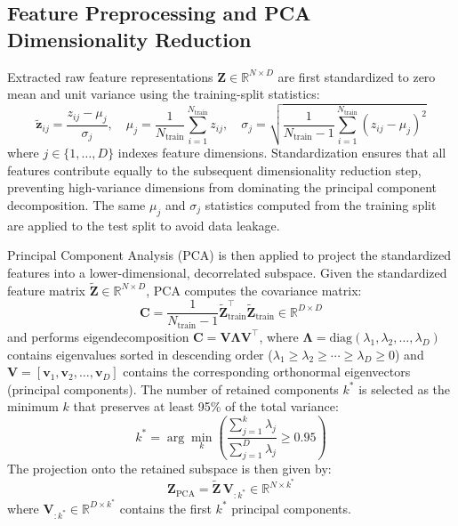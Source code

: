 \subsection{Feature Preprocessing and PCA Dimensionality Reduction}

Extracted raw feature representations $\mathbf{Z} \in \mathbb{R}^{N \times D}$ are first standardized to zero mean and unit variance using the training-split statistics:
\begin{equation}
\tilde{\mathbf{z}}_{ij} = \frac{z_{ij} - \mu_j}{\sigma_j}, \quad \mu_j = \frac{1}{N_{\text{train}}} \sum_{i=1}^{N_{\text{train}}} z_{ij}, \quad \sigma_j = \sqrt{\frac{1}{N_{\text{train}}-1} \sum_{i=1}^{N_{\text{train}}} (z_{ij} - \mu_j)^2}
\label{eq:standardization}
\end{equation}
where $j \in \{1, \ldots, D\}$ indexes feature dimensions. Standardization ensures that all features contribute equally to the subsequent dimensionality reduction step, preventing high-variance dimensions from dominating the principal component decomposition. The same $\mu_j$ and $\sigma_j$ statistics computed from the training split are applied to the test split to avoid data leakage.

Principal Component Analysis (PCA) is then applied to project the standardized features into a lower-dimensional, decorrelated subspace. Given the standardized feature matrix $\tilde{\mathbf{Z}} \in \mathbb{R}^{N \times D}$, PCA computes the covariance matrix:
\begin{equation}
\mathbf{C} = \frac{1}{N_{\text{train}}-1} \tilde{\mathbf{Z}}_{\text{train}}^\top \tilde{\mathbf{Z}}_{\text{train}} \in \mathbb{R}^{D \times D}
\label{eq:covariance}
\end{equation}
and performs eigendecomposition $\mathbf{C} = \mathbf{V} \boldsymbol{\Lambda} \mathbf{V}^\top$, where $\boldsymbol{\Lambda} = \text{diag}(\lambda_1, \lambda_2, \ldots, \lambda_D)$ contains eigenvalues sorted in descending order ($\lambda_1 \ge \lambda_2 \ge \cdots \ge \lambda_D \ge 0$) and $\mathbf{V} = [\mathbf{v}_1, \mathbf{v}_2, \ldots, \mathbf{v}_D]$ contains the corresponding orthonormal eigenvectors (principal components). The number of retained components $k^*$ is selected as the minimum $k$ that preserves at least 95\% of the total variance:
\begin{equation}
k^* = \arg\min_{k} \left( \frac{\sum_{j=1}^{k} \lambda_j}{\sum_{j=1}^{D} \lambda_j} \ge 0.95 \right)
\label{eq:pca_k}
\end{equation}
The projection onto the retained subspace is then given by:
\begin{equation}
\mathbf{Z}_{\text{PCA}} = \tilde{\mathbf{Z}} \, \mathbf{V}_{:k^*} \in \mathbb{R}^{N \times k^*}
\label{eq:pca_projection}
\end{equation}
where $\mathbf{V}_{:k^*} \in \mathbb{R}^{D \times k^*}$ contains the first $k^*$ principal components.

